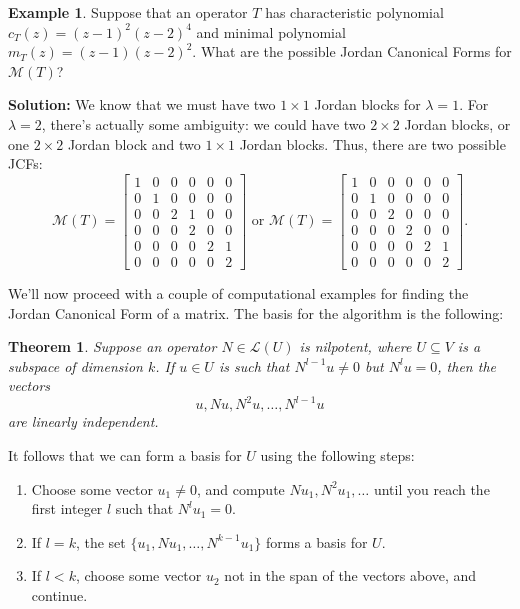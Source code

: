 \documentclass[12pt,letterpaper]{article}
\newtheorem{theorem}{Theorem}
\theoremstyle{definition}
\newtheorem{example}{Example}
\renewcommand{\L}{\mathcal{L}}
\newcommand{\M}{\mathcal{M}}
\begin{document}
\begin{example}
 Suppose that an operator $T$ has characteristic polynomial $c_T(z) = (z-1)^2(z-2)^4$ and minimal polynomial $m_T(z) = (z-1)(z-2)^2$. What are the possible Jordan Canonical Forms for $\M(T)$?

\bigskip

{\bf Solution:} We know that we must have two $1\times 1$ Jordan blocks for $\lambda=1$. For $\lambda=2$, there's actually some ambiguity: we could have two $2\times 2$ Jordan blocks, or one $2\times 2$ Jordan block and two $1\times 1$ Jordan blocks. Thus, there are two possible JCFs:
\[
 \M(T) = \begin{bmatrix}1&0&0&0&0&0\\
          0&1&0&0&0&0\\
          0&0&2&1&0&0\\
          0&0&0&2&0&0\\
          0&0&0&0&2&1\\
          0&0&0&0&0&2
         \end{bmatrix}
\text{ or }
\M(T) = \begin{bmatrix}1&0&0&0&0&0\\
          0&1&0&0&0&0\\
          0&0&2&0&0&0\\
          0&0&0&2&0&0\\
          0&0&0&0&2&1\\
          0&0&0&0&0&2
         \end{bmatrix}.
\]
\end{example}
We'll now proceed with a couple of computational examples for finding the Jordan Canonical Form of a matrix. The basis for the algorithm is the following:
\begin{theorem}
 Suppose an operator $N\in\L(U)$ is nilpotent, where $U\subseteq V$ is a subspace of dimension $k$. If $u\in U$ is such that $N^{l-1}u\neq 0$ but $N^{l}u=0$, then the vectors
\[
 u, Nu, N^2u,\ldots, N^{l-1}u
\]
are linearly independent. 
\end{theorem}
It follows that we can form a basis for $U$ using the following steps:
\begin{enumerate}
 \item Choose some vector $u_1\neq 0$, and compute $Nu_1, N^2u_1,\ldots$ until you reach the first integer $l$ such that $N^lu_1=0$.
 \item If $l=k$, the set $\{u_1,Nu_1,\ldots, N^{k-1}u_1\}$ forms a basis for $U$.
 \item If $l<k$, choose some vector $u_2$ not in the span of the vectors above, and continue.
\end{enumerate}
\end{document}
